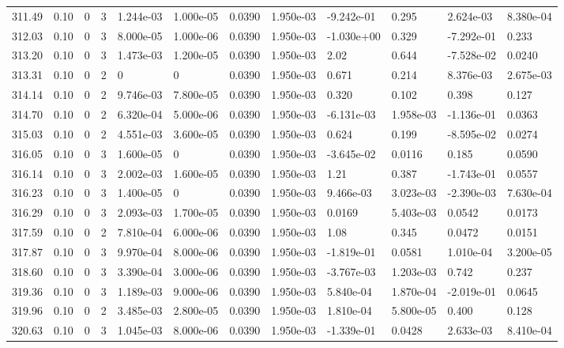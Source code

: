 \documentclass[preview]{standalone}
\begin{document}
{{{{{{{{{{\begin{tabular}{L{1.2cm}C{1.2cm} C{0.3cm}C{0.5cm} C{1.4cm}C{1.4cm} C{1.4cm}C{1.4cm} C{1.6cm}C{1.6cm} C{1.6cm}C{1.6cm}}
  311.49  &  0.10  & 0     &  3 &  1.244e-03  & 1.000e-05  &  0.0390&   1.950e-03& -9.242e-01 & 0.295   &  2.624e-03 & 8.380e-04  \\ 
  312.03  &  0.10  & 0     &  3 &  8.000e-05  & 1.000e-06  &  0.0390&   1.950e-03& -1.030e+00 & 0.329   &  -7.292e-01 & 0.233  \\ 
  313.20  &  0.10  & 0     &  3 &  1.473e-03  & 1.200e-05  &  0.0390&   1.950e-03& 2.02 & 0.644   &  -7.528e-02 & 0.0240  \\ 
  313.31  &  0.10  & 0     &  2 &  0  & 0  &  0.0390&   1.950e-03& 0.671 & 0.214   &  8.376e-03 & 2.675e-03  \\ 
  314.14  &  0.10  & 0     &  2 &  9.746e-03  & 7.800e-05  &  0.0390&   1.950e-03& 0.320 & 0.102   &  0.398 & 0.127  \\ 
  314.70  &  0.10  & 0     &  2 &  6.320e-04  & 5.000e-06  &  0.0390&   1.950e-03& -6.131e-03 & 1.958e-03   &  -1.136e-01 & 0.0363  \\ 
  315.03  &  0.10  & 0     &  2 &  4.551e-03  & 3.600e-05  &  0.0390&   1.950e-03& 0.624 & 0.199   &  -8.595e-02 & 0.0274  \\ 
  316.05  &  0.10  & 0     &  3 &  1.600e-05  & 0  &  0.0390&   1.950e-03& -3.645e-02 & 0.0116   &  0.185 & 0.0590  \\ 
  316.14  &  0.10  & 0     &  3 &  2.002e-03  & 1.600e-05  &  0.0390&   1.950e-03& 1.21 & 0.387   &  -1.743e-01 & 0.0557  \\ 
  316.23  &  0.10  & 0     &  3 &  1.400e-05  & 0  &  0.0390&   1.950e-03& 9.466e-03 & 3.023e-03   &  -2.390e-03 & 7.630e-04  \\ 
  316.29  &  0.10  & 0     &  3 &  2.093e-03  & 1.700e-05  &  0.0390&   1.950e-03& 0.0169 & 5.403e-03   &  0.0542 & 0.0173  \\ 
  317.59  &  0.10  & 0     &  2 &  7.810e-04  & 6.000e-06  &  0.0390&   1.950e-03& 1.08 & 0.345   &  0.0472 & 0.0151  \\ 
  317.87  &  0.10  & 0     &  3 &  9.970e-04  & 8.000e-06  &  0.0390&   1.950e-03& -1.819e-01 & 0.0581   &  1.010e-04 & 3.200e-05  \\ 
  318.60  &  0.10  & 0     &  3 &  3.390e-04  & 3.000e-06  &  0.0390&   1.950e-03& -3.767e-03 & 1.203e-03   &  0.742 & 0.237  \\ 
  319.36  &  0.10  & 0     &  3 &  1.189e-03  & 9.000e-06  &  0.0390&   1.950e-03& 5.840e-04 & 1.870e-04   &  -2.019e-01 & 0.0645  \\ 
  319.96  &  0.10  & 0     &  2 &  3.485e-03  & 2.800e-05  &  0.0390&   1.950e-03& 1.810e-04 & 5.800e-05   &  0.400 & 0.128  \\ 
  320.63  &  0.10  & 0     &  3 &  1.045e-03  & 8.000e-06  &  0.0390&   1.950e-03& -1.339e-01 & 0.0428   &  2.633e-03 & 8.410e-04  \\ 
\hline 
\end{tabular} 

}}}}}}}}}}
\end{document}
